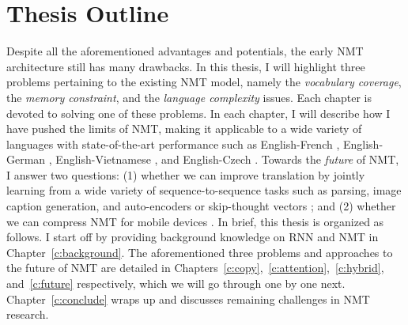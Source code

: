 \section{Thesis Outline}
Despite all the aforementioned advantages and potentials, the early NMT architecture
\cite{sutskever14,cho14} still has many drawbacks. In this thesis, I will
highlight three problems pertaining to the existing NMT model, namely the
{\it vocabulary coverage}, the {\it memory constraint}, and the {\it
language complexity} issues. Each chapter is devoted to solving one of these
problems. In each chapter, I will describe how I have pushed the limits of NMT, making it
applicable to a wide variety of languages with state-of-the-art performance such as
English-French \cite{luong15}, English-German \cite{luong15attn,luong15iwslt},
English-Vietnamese \cite{luong15iwslt}, and
English-Czech \cite{luong16}. Towards the {\it future} of
NMT, I answer two questions: (1) whether we can improve translation by jointly
learning from a wide variety of sequence-to-sequence tasks such as parsing,
image caption generation, and auto-encoders or skip-thought vectors
\cite{luong16iclr}; and (2)
whether we can compress NMT for mobile devices \cite{see16}.
In brief, this thesis is organized as follows. I start off by providing background knowledge on RNN and NMT
in Chapter~\ref{c:background}. 
The aforementioned three problems and approaches to the future of NMT are detailed in
Chapters~\ref{c:copy},~\ref{c:attention},~\ref{c:hybrid}, and~\ref{c:future}
respectively, which we will go through one by one next.
Chapter~\ref{c:conclude} wraps up and discusses remaining challenges in NMT research.

